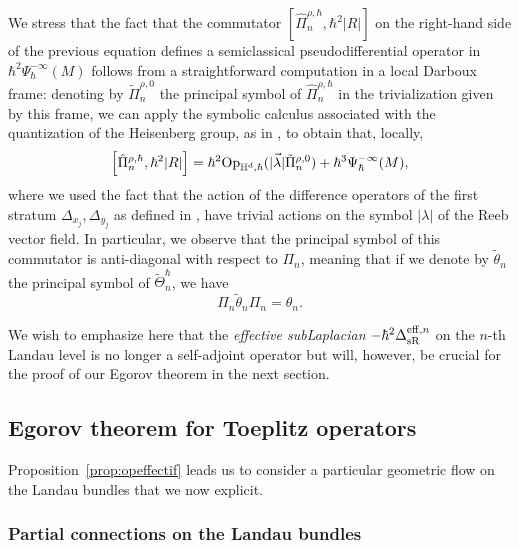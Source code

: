 \documentclass[12pt,a4paper]{amsart}
\theoremstyle{plain}
\theoremstyle{definition}
\theoremstyle{remark}
\numberwithin{equation}{section}
\theoremstyle{definition}
\def \Op{{\rm Op}}
\def \Heis{\mathbb{H}}
\numberwithin{equation}{section}
\begin{document}
We stress that the fact that the commutator $\left[\hat{\Pi}_n^{\rho,\hbar},\hbar^2|R|\right]$ on the right-hand side of the previous equation defines a semiclassical pseudodifferential operator in $\hbar^2\Psi_\hbar^{-\infty}(M)$ follows from a straightforward computation in a local Darboux frame: denoting by $\tilde{\Pi}_n^{\rho,0}$ the principal symbol of $\hat{\Pi}_n^{\rho,\hbar}$ in the trivialization given by this frame, we can apply the symbolic calculus associated with the quantization of the Heisenberg group, as in \cite[Theorem 5.7]{FM}, to obtain that, locally,
\begin{equation*}
    \left[\hat{\Pi}_n^{\rho,\hbar},\hbar^2 |R|\right] = \hbar^2\Op_{\Heis^d,\hbar}(\vec{|\lambda|} \tilde{\Pi}_n^{\rho,0}) + \hbar^3\Psi_\hbar^{-\infty}(M),
\end{equation*}
where we used the fact that the action of the difference operators of the first stratum $\Delta_{x_j}, \Delta_{y_j}$ as defined in \cite[Section 6.3]{FR}, have trivial actions on the symbol $|\lambda|$ of the Reeb vector field. In particular, we observe that the principal symbol of this commutator is anti-diagonal with respect to $\Pi_n$, meaning that if we denote by $\tilde{\theta}_n$ the principal symbol of $\tilde{\Theta}_n^\hbar$, we have
\begin{equation}
    \label{eq:relationtildethetatheta}
    \Pi_n \tilde{\theta}_n\Pi_n = \theta_n.
\end{equation}

We wish to emphasize here that the \emph{effective subLaplacian} $-\hbar^2\Delta_{\rm sR}^{{\rm eff},n}$ on the $n$-th Landau level is no longer a self-adjoint operator but will, however, be crucial for the proof of our Egorov theorem in the next section.


\subsection{Egorov theorem for Toeplitz operators}

Proposition~\ref{prop:opeffectif} leads us to consider a particular geometric flow on the Landau bundles that we now explicit.

\subsubsection{Partial connections on the Landau bundles}
\label{subsubsect:partialconnectLandau}
\end{document}
